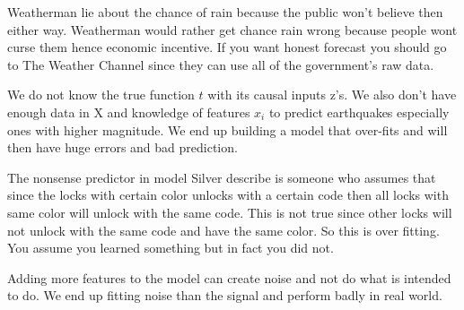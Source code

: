 \documentclass[12pt]{article}
\begin{document}
\begin{enumerate}

Weatherman lie about the chance of rain because the public won't believe then either way. Weatherman would rather get chance rain wrong because people wont curse them hence economic incentive.
If you want honest forecast you should go to The Weather Channel since they can use all of the government’s raw data. 


We do not know the true function $t$ with its causal inputs z's. We also don't have enough data in X and knowledge of features $x_i$ to predict earthquakes especially ones with higher magnitude. We end up building a model that over-fits and will then have huge errors and bad prediction.


The nonsense predictor in model Silver describe is someone who assumes that since the locks with certain color unlocks with a certain code then all locks with same color will unlock with the same code. This is not true since other locks will not unlock with the same code and have the same color. So this is over fitting. You assume you learned something but in fact you did not.



Adding more features to the model can create noise and not do what is intended to do. We end up fitting noise than the signal and perform badly in real world.



\end{enumerate}
\end{document}

